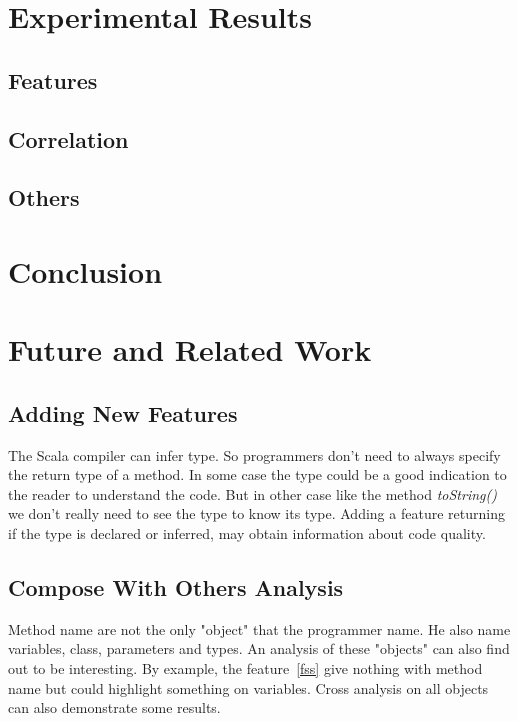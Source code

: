 \documentclass[12pt]{article}
\begin{document}
\section {Experimental Results}

\subsection {Features}

\subsection {Correlation}

\subsection {Others} 

\section {Conclusion} 

\section {Future and Related Work}
\subsection{Adding New Features}
The Scala compiler can infer type. So programmers don't need to always specify the return type of a method. In some case the type could be a good indication to the reader to understand the code. But in other case like the method \textit{toString()} we don't really need to see the type to know its type. Adding a feature returning if the type is declared or inferred, may obtain information about code quality.
\subsection{Compose With Others Analysis}
Method name are not the only "object" that the programmer name. He also name variables, class, parameters and types. An analysis of these "objects" can also find out to be interesting. By example, the feature~\ref{fss} give nothing with method name but could highlight something on variables. Cross analysis on all objects can also demonstrate some results.


\newpage



\end{document}
